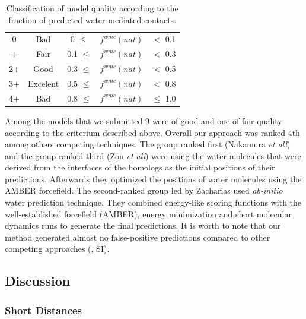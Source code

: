 \begin {table}[H]
 \begin{center}
 \begin{tabular}{ c | c | c  c  c}
  0 & Bad & 0 $\leq$ & $f^{wmc}(nat)$ & $<$ 0.1\\
  + & Fair & 0.1 $\leq$ & $f^{wmc}(nat)$ & $<$ 0.3\\
  2+ & Good & 0.3 $\leq$ & $f^{wmc}(nat)$ & $<$ 0.5\\
  3+ & Excelent & 0.5 $\leq$ & $f^{wmc}(nat)$ & $<$ 0.8\\
  4+ & Bad & 0.8 $\leq$ & $f^{wmc}(nat)$ & $\leq$ 1.0\\
  \end{tabular}
  \caption{Classification of model quality according to the fraction of predicted water-mediated contacts.}
  \label{Table: waterModelCriteria}
  \end{center}
\end{table}

Among the models that we submitted 9 were of good and one of fair quality according to the criterium described above. Overall our approach was ranked 4th 
among others competing techniques. The group ranked first (Nakamura \emph{et all}) and the group ranked third (Zou \emph{et all}) were using the 
water molecules that were derived from the interfaces of the homologs as the initial positions of their predictions. Afterwards they optimized the positions
of water molecules using the AMBER forcefield. The second-ranked group led by Zacharias used \emph{ab-initio} water prediction technique. They combined energy-like
scoring functions with the well-established forcefield (AMBER), energy minimization and short molecular dynamics runs to generate the final predictions.
It is worth to note that our method generated almost no false-positive predictions compared to other competing approaches (\cite{lensink2014blind}, SI).


\subsection{Discussion}
\subsubsection{Short Distances}


